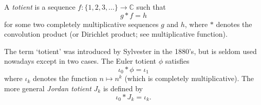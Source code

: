 \documentclass[12pt]{article}
\begin{document}
A \emph{totient} is a sequence $f:{\{1,2,3,\ldots\}}\to {\mathbb C}$ such
that $$g\ast f=h$$
for some two completely multiplicative sequences $g$ and $h$, where $\ast$
denotes the convolution product (or Dirichlet product; see multiplicative function).

The term `totient' was introduced by Sylvester in the 1880's, but is
seldom used nowadays except in two cases. The Euler totient $\phi$
satisfies
$$\iota_0\ast\phi = \iota_1$$
where $\iota_k$ denotes the function $n\mapsto n^k$ (which is completely
multiplicative). The more general \emph{Jordan totient} $J_k$ is defined by $$\iota_0\ast J_k=\iota_k.$$
\end{document}

